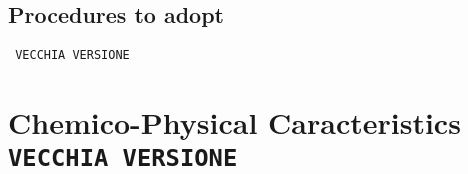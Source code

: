 \documentclass[a4paper]{report}
\begin{document}
\subsection{Procedures to adopt}




































\pagebreak



\texttt{\color{green} VECCHIA VERSIONE}




\section{Chemico-Physical Caracteristics \texttt{\color{red}VECCHIA VERSIONE}}
\end{document}
